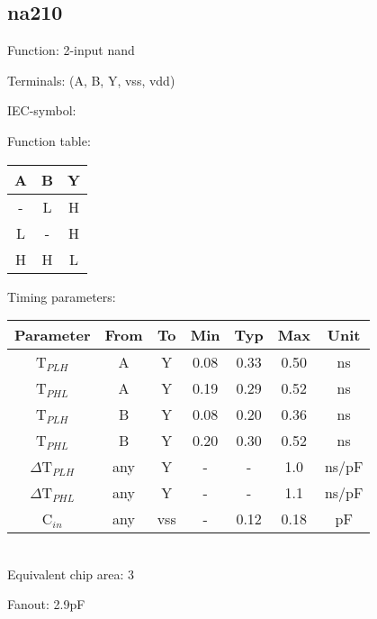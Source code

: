\subsection{na210}

Function: 2-input nand

Terminals: (A, B, Y, vss, vdd)


IEC-symbol:
\begin{figure}[bth]
\end{figure}

\begin{minipage}[t]{0.3\textwidth}
Function table:\\

\begin{tabular}{|c|c||c|}
\hline
A	&B	&Y\\
\hline
-	&L	&H\\
L	&-	&H\\
H	&H	&L\\
\hline
\end{tabular}
\end{minipage}
\hfill
\begin{minipage}[t]{0.6\textwidth}
Timing parameters:\\

\begin{tabular}{|c|cc|ccc|c|}
\hline
Parameter               &From            &To	&Min   	&Typ	&Max	&Unit\\
\hline
T$_{PLH}$               &A     		&Y      &0.08	&0.33	&0.50    &ns\\
T$_{PHL}$               &A    		&Y      &0.19	&0.29	&0.52    &ns\\
T$_{PLH}$               &B     		&Y      &0.08	&0.20	&0.36    &ns\\
T$_{PHL}$               &B    		&Y      &0.20	&0.30	&0.52    &ns\\
\hline
$\Delta$T$_{PLH}$       &any          	&Y      &-	&-	&1.0    &ns/pF\\
$\Delta$T$_{PHL}$       &any           	&Y      &-	&-	&1.1    &ns/pF\\
\hline
C$_{in}$                &any	    	&vss    &-	&0.12	&0.18   &pF\\
\hline
\end{tabular}
\end{minipage}
\\

Equivalent chip area: 3

Fanout: 2.9pF


\clearpage
